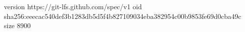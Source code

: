 version https://git-lfs.github.com/spec/v1
oid sha256:eeecac540def3b1283db5d5f4b827109034eba382954c00b9853fe69d0cba49c
size 8900
